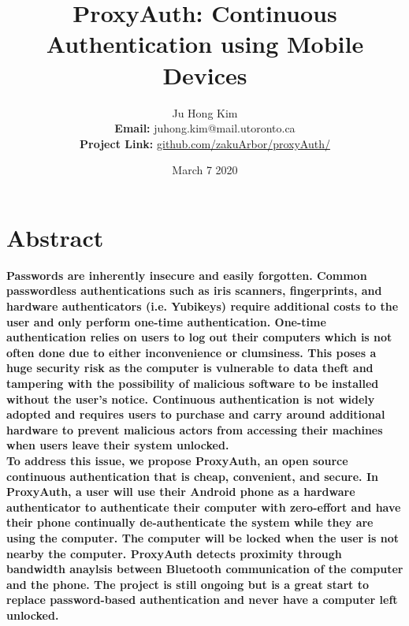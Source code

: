 \documentclass[letterpaper,twocolumn,10pt]{article}
\begin{document}


\doublespacing
\tableofcontents
\onehalfspacing


\title{\Large \bf ProxyAuth: Continuous Authentication using Mobile Devices}

\author{
{\rm Ju Hong Kim}\\
\rm \textbf{Email:} juhong.kim@mail.utoronto.ca\\
\rm \textbf{Project Link:} \href{https://github.com/zakuArbor/proxyAuth/}{github.com/zakuArbor/proxyAuth/}
}
\date{March 7 2020}

\maketitle

\thispagestyle{empty}


\section*{Abstract}
%
\textbf{Passwords are inherently insecure and easily forgotten. Common passwordless authentications such as iris scanners, fingerprints, and hardware authenticators (i.e. Yubikeys) require additional costs to the user and only perform one-time authentication. One-time authentication relies on users to log out their computers which is not often done due to either inconvenience or clumsiness. This poses a huge security risk as the computer is vulnerable to data theft and tampering with the possibility of malicious software to be installed without the user's notice. Continuous authentication is not widely adopted and requires users to purchase and carry around additional hardware to prevent malicious actors from accessing their machines when users leave their system unlocked.\\
To address this issue, we propose ProxyAuth, an open source continuous authentication that is cheap, convenient, and secure. In ProxyAuth, a user will use their Android phone as a hardware authenticator to authenticate their computer with zero-effort and have their phone continually de-authenticate the system while they are using the computer. The computer will be locked when the user is not nearby the computer. ProxyAuth detects proximity through bandwidth anaylsis between Bluetooth communication of the computer and the phone. The project is still ongoing but is a great start to replace password-based authentication and never have a computer left unlocked.}
\end{document}
